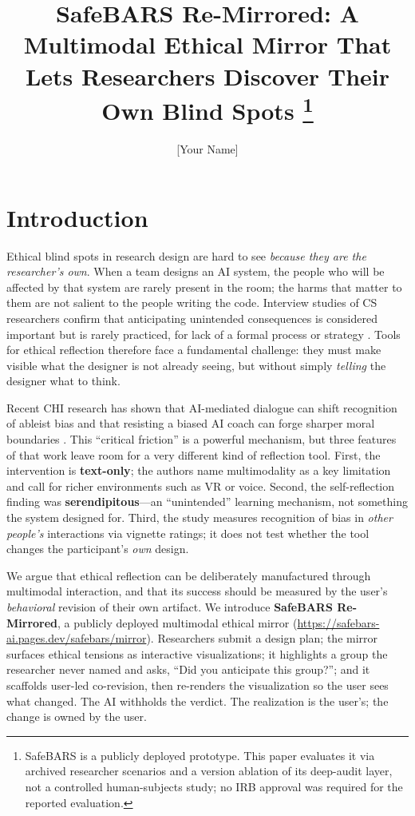 \documentclass[sigconf,screen]{acmart}
\title{SafeBARS Re-Mirrored: A Multimodal Ethical Mirror That Lets Researchers
Discover Their Own Blind Spots%
\thanks{SafeBARS is a publicly deployed prototype. This paper evaluates it via
archived researcher scenarios and a version ablation of its deep-audit layer,
not a controlled human-subjects study; no IRB approval was required for the
reported evaluation.}}
\author{[Your Name]}
\affiliation{\institution{Xi'an Jiaotong-Liverpool University}\country{China}}
\begin{document}
\maketitle

\section{Introduction}

Ethical blind spots in research design are hard to see \emph{because they are
the researcher's own}. When a team designs an AI system, the people who will be
affected by that system are rarely present in the room; the harms that matter
to them are not salient to the people writing the code. Interview studies of
CS researchers confirm that anticipating unintended consequences is considered
important but is rarely practiced, for lack of a formal process or strategy
\citep{do2023}. Tools for ethical reflection therefore face a fundamental
challenge: they must make visible what the designer is not already seeing, but
without simply \emph{telling} the designer what to think.

Recent CHI research has shown that AI-mediated dialogue can shift recognition
of ableist bias and that resisting a biased AI coach can forge sharper moral
boundaries \citep{taheri26}. This ``critical friction'' is a powerful mechanism,
but three features of that work leave room for a very different kind of
reflection tool. First, the intervention is \textbf{text-only}; the authors name
multimodality as a key limitation and call for richer environments such as VR
or voice. Second, the self-reflection finding was \textbf{serendipitous}---an
``unintended'' learning mechanism, not something the system designed for.
Third, the study measures recognition of bias in \emph{other people's}
interactions via vignette ratings; it does not test whether the tool changes the
participant's \emph{own} design.

We argue that ethical reflection can be deliberately manufactured through
multimodal interaction, and that its success should be measured by the user's
\emph{behavioral} revision of their own artifact. We introduce \textbf{SafeBARS
Re-Mirrored}, a publicly deployed multimodal ethical mirror
(\url{https://safebars-ai.pages.dev/safebars/mirror}). Researchers submit a
design plan; the mirror surfaces ethical tensions as interactive visualizations;
it highlights a group the researcher never named and asks, ``Did you anticipate
this group?''; and it scaffolds user-led co-revision, then re-renders the
visualization so the user sees what changed. The AI withholds the verdict. The
realization is the user's; the change is owned by the user.
\end{document}
